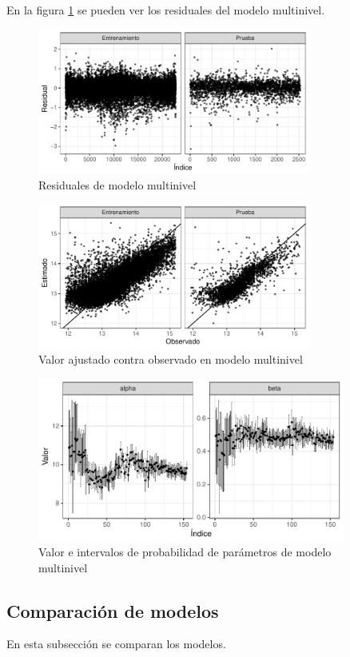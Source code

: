En la figura \ref{fig:three_levels_resids} se pueden ver los residuales del modelo multinivel.


\begin{figure}[H]
    \centering
    \includegraphics[width=0.8\textwidth]{images/three_levels_resids.pdf}
    \caption{Residuales de modelo multinivel}
    \label{fig:three_levels_resids}
\end{figure}

\begin{figure}[H]
    \centering
    \includegraphics[width=0.8\textwidth]{images/three_levels_obs_vs_pred.pdf}
    \caption{Valor ajustado contra observado en modelo multinivel}
    \label{fig:three_levels_obs_vs_pred}
\end{figure}

\begin{figure}[H]
    \centering
    \includegraphics[width=0.9\textwidth]{images/three_levels_param_values.pdf}
    \caption{Valor e intervalos de probabilidad de parámetros de modelo multinivel}
    \label{fig:three_levels_param_values}
\end{figure}

\subsection{Comparación de modelos}

En esta subsección se comparan los modelos.
